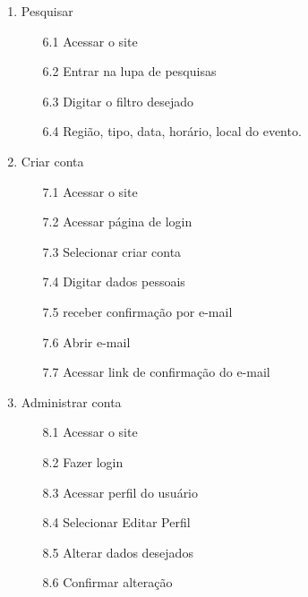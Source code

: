 \documentclass[12pt]{article}
\begin{document}
\begin{enumerate}
                \item Pesquisar
                    \begin{enumerate}
                        \item[6.1] Acessar o site
                        \item[6.2] Entrar na lupa de pesquisas
                        \item[6.3] Digitar o filtro desejado
                        \item[6.4] Região, tipo, data, horário, local do evento.
                    \end{enumerate}
        
            \item Criar conta
                \begin{enumerate}
                    \item[7.1] Acessar o site
                    \item[7.2] Acessar página de login
                    \item[7.3] Selecionar criar conta
                    \item[7.4] Digitar dados pessoais
                    \item[7.5] receber confirmação por e-mail
                    \item[7.6] Abrir e-mail
                    \item[7.7] Acessar link de confirmação do e-mail
                \end{enumerate}
        
            \item Administrar conta
                \begin{enumerate}
                    \item[8.1] Acessar o site
                    \item[8.2] Fazer login
                    \item[8.3] Acessar perfil do usuário
                    \item[8.4] Selecionar Editar Perfil
                    \item[8.5] Alterar dados desejados
                    \item[8.6] Confirmar alteração
                \end{enumerate}
            

\end{enumerate}
\end{document}
